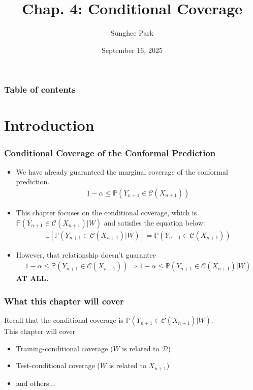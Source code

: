 \documentclass[compress]{beamer}
\begin{document}
\title{Chap. 4: Conditional Coverage}
\author{Sunghee Park}
\date{September 16, 2025}

{
\begin{frame}[plain]
  \titlepage
\end{frame}
}

\begin{frame}\frametitle{Table of contents}
    \tableofcontents
\end{frame}

\section{Introduction}
\begin{frame}\frametitle{Conditional Coverage of the Conformal Prediction}
	\begin{itemize}
		\item We have already guaranteed the marginal coverage of the conformal prediction.
		\begin{align*}
			1-\alpha \le \mathbb{P}(Y_{n+1}\in \mathcal{C}(X_{n+1}))
		\end{align*}
		\item This chapter focuses on the conditional coverage, which is $\mathbb{P}(Y_{n+1}\in \mathcal{C}(X_{n+1})|W)$ and satisfies the equation below:
		\begin{align*}
			\mathbb{E}[\mathbb{P}(Y_{n+1}\in \mathcal{C}(X_{n+1})|W)] = \mathbb{P}(Y_{n+1}\in \mathcal{C}(X_{n+1}))
		\end{align*}
		
		\item However, that relationship doesn't guarantee 
		\begin{align*}
			1-\alpha \le \mathbb{P}(Y_{n+1}\in \mathcal{C}(X_{n+1})) \Rightarrow 1-\alpha \le \mathbb{P}(Y_{n+1}\in \mathcal{C}(X_{n+1})|W)
		\end{align*}
		\textbf{AT ALL.}
	\end{itemize}
\end{frame}

\begin{frame}\frametitle{What this chapter will cover}
	Recall that the conditional coverage is $\mathbb{P}(Y_{n+1}\in \mathcal{C}(X_{n+1})|W)$.\\
	This chapter will cover	
	\begin{itemize}
		\item Training-conditional coverage ($W$ is related to $\mathcal{D}$)
		\item Test-conditional coverage ($W$ is related to $X_{n+1}$)
		\item and others...
	\end{itemize}
\end{frame}
\end{document}
